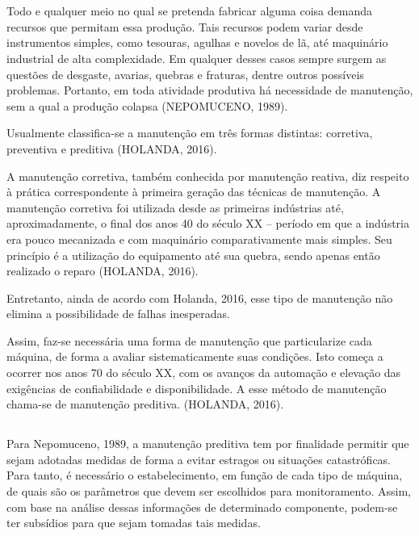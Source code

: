 \documentclass[
	12pt,				
	oneside,			
	a4paper,			
	english,			
	brazil,			
	]{abntex2ppgsi}
\begin{document}
\section{}
Todo e qualquer meio no qual se pretenda fabricar alguma coisa demanda recursos que permitam essa produção. Tais recursos podem variar desde instrumentos simples, como tesouras, agulhas e novelos de lã, até maquinário industrial de alta complexidade. Em qualquer desses casos sempre surgem as questões de desgaste, avarias, quebras e fraturas, dentre outros possíveis problemas. Portanto, em toda atividade produtiva  há necessidade de manutenção, sem a qual a produção colapsa (NEPOMUCENO, 1989).

	Usualmente classifica-se a manutenção em três formas distintas: corretiva, preventiva e preditiva (HOLANDA, 2016). 

	A manutenção corretiva, também conhecida por manutenção reativa, diz respeito à prática correspondente à primeira geração das técnicas de manutenção. A manutenção corretiva foi utilizada desde as primeiras indústrias até, aproximadamente, o final dos anos 40 do século XX – período em que a indústria era pouco mecanizada e com maquinário comparativamente mais simples. Seu princípio é a utilização do equipamento até sua quebra, sendo apenas então realizado o reparo (HOLANDA, 2016). 
	
Entretanto, ainda de acordo com Holanda, 2016, esse tipo de manutenção não elimina a possibilidade de falhas inesperadas.

Assim, faz-se necessária uma forma de manutenção que particularize cada máquina, de forma a avaliar sistematicamente suas condições. Isto começa a ocorrer nos anos 70 do século XX, com os avanços da automação e elevação das exigências de confiabilidade e disponibilidade. A esse método de manutenção chama-se de manutenção preditiva. (HOLANDA, 2016).  

\subsection{}

Para Nepomuceno, 1989, a manutenção preditiva tem por finalidade permitir que sejam adotadas medidas de forma a evitar estragos ou situações catastróficas. Para tanto, é necessário o estabelecimento, em função de cada tipo de máquina, de quais são os parâmetros que devem ser escolhidos para monitoramento. Assim, com base na análise dessas informações de determinado componente, podem-se ter subsídios para que sejam tomadas tais medidas. 
\end{document}
